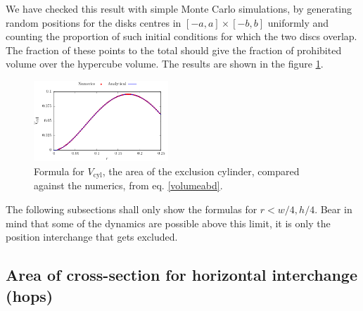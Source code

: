 \documentclass[letterpaper,10pt, jcp, aps]{revtex4-1}
\begin{document}



We have checked this result with simple Monte Carlo simulations, 
by generating random positions for the disks centres in 
$[-a,a] \times [-b,b]$ uniformly and 
counting the proportion of such initial conditions for 
which the two discs overlap. The fraction of these points to the 
total should give the fraction of prohibited volume over the hypercube
volume. The results are shown in the figure \ref{VolMonteC}.

\begin{figure}[h]
\centering
\includegraphics[width=0.45\textwidth]{./FigurasPerfectas/VolCyl02.pdf}
\caption{Formula for $V_\text{cyl}$, the area of the exclusion cylinder, compared
against the numerics, from eq. \ref{volumeabd}.
 }\label{VolMonteC}
\end{figure}

The following subsections shall only show the formulas for $r<w/4, h/4$.
Bear in mind that some of the dynamics are possible above this limit,
it is only the position interchange that gets excluded. \\



\subsection{Area of cross-section for
 horizontal interchange (hops)}\label{areahop}
\end{document}
